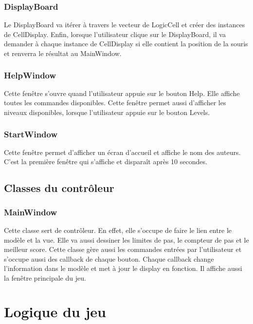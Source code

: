 \documentclass[utf8]{article}
\begin{document}
\begin{large}
\subsubsection{DisplayBoard}
\indent
\par
Le DisplayBoard va itérer à travers le vecteur de LogicCell et créer des
instances de CellDisplay. Enfin, lorsque l'utilisateur clique sur le
DisplayBoard, il va demander à chaque instance de CellDisplay si elle
contient la position de la souris et renverra le résultat au MainWindow.
\par
\subsubsection{HelpWindow}
\indent
\par
Cette fenêtre s'ouvre quand l'utilisateur appuie sur le bouton Help. Elle
affiche toutes les commandes disponibles. Cette fenêtre permet aussi d'afficher
les niveaux disponibles, lorsque l'utilisateur appuie sur le bouton Levels.
\par
\subsubsection{StartWindow}
\indent
\par
Cette fenêtre permet d'afficher un écran d'accueil et affiche le nom des
auteurs. C'est la première fenêtre qui s'affiche et disparaît après 10 secondes.
\par

\subsection{Classes du contrôleur}
\subsubsection{MainWindow}
\indent
\par
Cette classe sert de contrôleur. En effet, elle s'occupe de faire le lien entre
le modèle et la vue. Elle va aussi dessiner les limites de pas, le compteur de
pas et le meilleur score. Cette classe gère aussi les commandes entrées par
l'utilisateur et s'occupe aussi des callback de chaque bouton. Chaque callback
change l'information dans le modèle et met à jour le display en fonction. Il
affiche aussi la fenêtre principale du jeu.
\par
\section{Logique du jeu}

\end{large}
\end{document}
